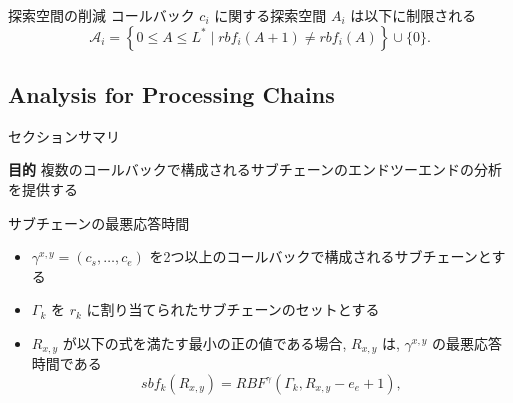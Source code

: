 \begin{frame}{探索空間の削減}
    コールバック $c_i$ に関する探索空間 $A_i$ は以下に制限される
    \begin{equation*}
        \mathcal{A}_{i}=\left\{0 \leq A \leq L^{*} \mid r b f_{i}(A+1) \neq r b f_{i}(A)\right\} \cup\{0\} .
    \end{equation*}
\end{frame}


\subsection{Analysis for Processing Chains}
\label{ssec: analysis for processing chains}

\begin{frame}{セクションサマリ}
    \begin{itembox}[l]{\textbf{目的}}
        複数のコールバックで構成されるサブチェーンのエンドツーエンドの分析を提供する
    \end{itembox}
\end{frame}

\begin{frame}[label=lemma8]{サブチェーンの最悪応答時間}
    \begin{lemma}[サブチェーンの最悪応答時間]
        \begin{itemize}
            \item $\gamma^{x, y}=\left(c_{s}, \ldots, c_{e}\right)$ を2つ以上のコールバックで構成されるサブチェーンとする
            \item $\Gamma_{k}$ を $r_{k}$ に割り当てられたサブチェーンのセットとする
            \item $R_{x, y}$ が以下の式を満たす最小の正の値である場合, $R_{x, y}$ は, $\gamma^{x, y}$ の最悪応答時間である
                  \begin{equation*}
                      s b f_{k}\left(R_{x, y}\right)=R B F^{\gamma}\left(\Gamma_{k}, R_{x, y}-e_{e}+1\right),
                  \end{equation*}
        \end{itemize}
    \end{lemma}
\end{frame}
